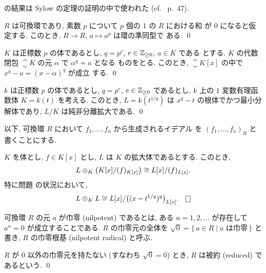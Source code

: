\documentclass[12pt,twoside]{jarticle}
\begin{document}
\begin{rem}
   の結果は Sylow の定理の証明の中で使われた
  (cf.\ \cite{morita} p.~47).
\end{rem}

\begin{question}
  $R$ は可換環であり, 素数 $p$ について $p$ 個の $1$ の $R$ における和
  が $0$ になると仮定する. このとき, $R\to R$, $a\mapsto a^p$ は環の準同型で
  ある. \qed
\end{question}

\begin{question}
  $K$ は正標数 $p$ の体であるとし, $q=p^e$, $e\in{\mathbb Z}_{\ge0}$, $a\in K$ である
  とする. $K$ の代数閉包 $\closure{K}$ の元 $\alpha$ で $\alpha^q=a$ となる
  ものをとる.  このとき, $\closure{K}[x]$ の中で $x^q-a=(x-\alpha)^q$ が成立
  する. \qed
\end{question}

\begin{question}\label{q:purely-inseparable-1}
  $k$ は正標数 $p$ の体であるとし, $q=p^e$, $e\in{\mathbb Z}_{\ge0}$ であるとし,
  $k$ 上の $1$ 変数有理函数体 $K=k(t)$ を考える.  このとき, $L=k(t^{1/q})$ 
  は $x^q - t$ の根体でかつ最小分解体であり, $L/K$ は純非分離拡大である.
  \qed
\end{question}

以下, 可換環 $R$ において $f_1,\ldots,f_n$ から生成されるイデアル
を $(f_1,\ldots,f_n)_R$ と書くことにする. 

\begin{question}
  $K$ を体とし, $f\in K[x]$ とし, $L$ は $K$ の拡大体であるとする. 
  このとき, 
  \begin{equation*}
    L\otimes_K \big(K[x]/(f)_{K[x]}\big) \cong L[x]/(f)_{L[x]}.
  \end{equation*}
  特に問題  の状況において,
  \begin{equation*}
    L\o_K L \isom L[x]/\big((x - t^{1/q})^q\big)_{L[x]}.
    \qed
  \end{equation*}
\end{question}

\begin{definition}[被約 (reduced)]
  可換環 $R$ の元 $a$ が巾零 (nilpotent) であるとは,
  ある $n=1,2,\ldots$ が存在して $a^n=0$ が成立することである.
  $R$ の巾零元の全体を $\sqrt{0}=\{\,a\in R\mid\text{$a$ は巾零}\,\}$ と書き, 
  $R$ の巾零根基 (nilpotent radical) と呼ぶ.  

  $R$ が $0$ 以外の巾零元を持たない (すなわち $\sqrt{0}=0$) とき,
  $R$ は被約 (reduced) であるという. \qed
\end{definition}
\end{document}
